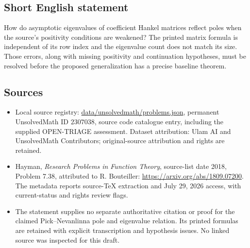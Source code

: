 \documentclass[11pt]{article}
\begin{document}
\subsection{Short English statement}
How do asymptotic eigenvalues of coefficient Hankel matrices reflect poles when the source's positivity conditions are weakened? The printed matrix formula is independent of its row index and the eigenvalue count does not match its size. Those errors, along with missing positivity and continuation hypotheses, must be resolved before the proposed generalization has a precise baseline theorem.
\subsection{Sources}
\begin{itemize}
\item Local source registry: \url{data/unsolvedmath/problems.json}, permanent UnsolvedMath ID $2307038$, source code catalogue entry, including the supplied OPEN-TRIAGE assessment. Dataset attribution: Ulam AI and UnsolvedMath Contributors; original-source attribution and rights are retained.
\item Hayman, \emph{Research Problems in Function Theory}, source-list date 2018, Problem 7.38, attributed to R. Bouteiller: \url{https://arxiv.org/abs/1809.07200}. The metadata reports source-TeX extraction and July 29, 2026 access, with current-status and rights review flags.
\item The statement supplies no separate authoritative citation or proof for the claimed Pick--Nevanlinna pole and eigenvalue relation. Its printed formulas are retained with explicit transcription and hypothesis issues. No linked source was inspected for this draft.
\end{itemize}
\end{document}
